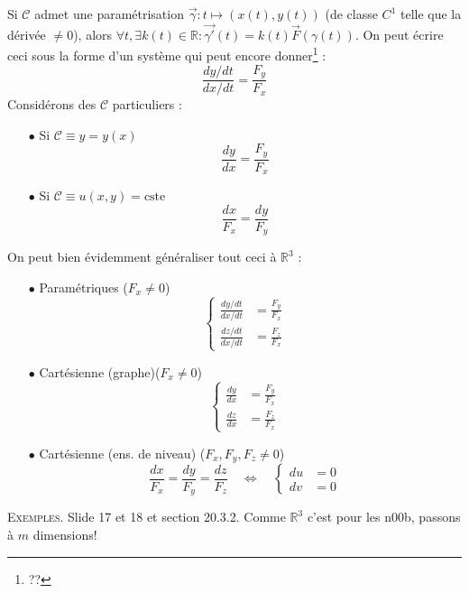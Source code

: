 	Si $\mathcal{C}$ admet une paramétrisation $\vec{\gamma} :t\mapsto
	(x(t),y(t))$ (de classe $C^1$ telle que la dérivée $\neq 0$), alors 
	$\forall t, \exists k(t)\in\mathbb{R} : \vec{\gamma'}(t) = k(t)\vec{F}
	(\gamma(t))$. On peut écrire ceci sous la forme d'un système qui peut 
	encore donner\footnote{??} :
	\begin{equation}
	\dfrac{dy/dt}{dx/dt} = \dfrac{F_y}{F_x} 
	\end{equation}
	Considérons des $\mathcal{C}$ particuliers :
	\begin{itemize}
	\item[$\bullet$] Si $\mathcal{C} \equiv y=y(x)$
	\begin{equation}
	\frac{dy}{dx}=\frac{F_y}{F_x}
	\end{equation}
	\item[$\bullet$] Si $\mathcal{C} \equiv u(x,y) = \text{cste}$
	\begin{equation}
	\frac{dx}{F_x} = \frac{dy}{F_y}
	\end{equation}
	\end{itemize}
	On peut bien évidemment généraliser tout ceci à $\mathbb{R}^3$ :
	\begin{itemize}
	\item[$\bullet$] Paramétriques ($F_x \neq 0$)
	\begin{equation}
	\left\{\begin{array}{ll}
	\frac{dy/dt}{dx/dt} &=\frac{F_y}{F_x}\\
	\frac{dz/dt}{dx/dt} &= \frac{F_z}{F_x}
	\end{array}\right.
	\end{equation}
	\item[$\bullet$] Cartésienne (graphe)($F_x\neq0$)
	\begin{equation}
	\left\{\begin{array}{ll}
	\frac{dy}{dx} &= \frac{F_y}{F_x}\\
	\frac{dz}{dx} &= \frac{F_z}{F_x}
	\end{array}\right.
	\end{equation}	
	\item[$\bullet$] Cartésienne (ens. de niveau) ($F_x,F_y,F_z\neq0$)
	\begin{equation}
	\frac{dx}{F_x}=\frac{dy}{F_y}=\frac{dz}{F_z}\quad\Leftrightarrow\quad
	\left\{\begin{array}{ll}
	du &= 0\\
	dv &= 0	
	\end{array}\right.
	\end{equation}	
	\end{itemize}
	\textsc{Exemples.} Slide 17 et 18 et section 20.3.2.
	Comme $\mathbb{R}^3$ c'est pour les n00b, passons à $m$ dimensions!
	
